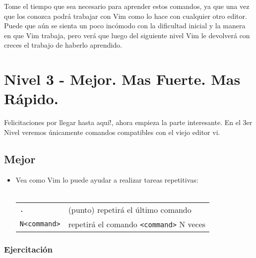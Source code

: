 Tome el tiempo que sea necesario para aprender estos comandos,
ya que una vez que los conozca podrá trabajar con Vim como lo
hace con cualquier otro editor. Puede que aún se sienta un poco incómodo 
con la dificultad inicial y la manera en que Vim trabaja, pero verá
que luego del siguiente nivel Vim le devolverá con creces el trabajo
de haberlo aprendido.


\section{Nivel 3 - Mejor. Mas Fuerte. Mas Rápido.}


Felicitaciones por llegar hasta aquí!, ahora empieza la parte interesante.
En el 3er Nivel veremos únicamente comandos compatibles con el viejo editor vi.


\subsection{Mejor}


\begin{itemize}
	\item Vea como Vim lo puede ayudar a realizar tareas repetitivas: \\ \\
\begin{tabular}{ l l }
	\texttt{.} & (punto) repetirá el último comando \\
	\texttt{N<command>} & repetirá el comando \texttt{<command>} N veces \\
\end{tabular}
\end{itemize}


\subsubsection{Ejercitación}


